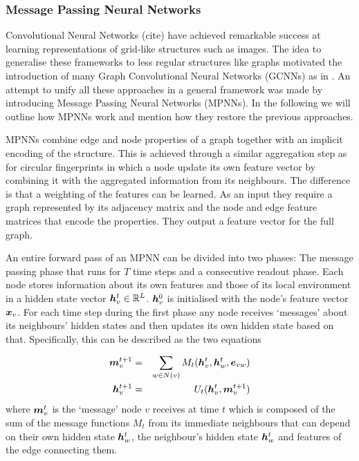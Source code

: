 \subsubsection{Message Passing Neural Networks}
\label{sec:GNN}

Convolutional Neural Networks (cite) have achieved remarkable success at learning representations of grid-like structures such as images. The idea to generalise these frameworks to less regular structures like graphs motivated the introduction of many Graph Convolutional Neural Networks (GCNNs) as in \citep{li2015gated,duvenaud2015convolutional,Kearnes_2016, Sch_tt_2017}. An attempt to unify all these approaches in a general framework was made by \cite{GilmerSRVD17} introducing Message Passing Neural Networks (MPNNs). In the following we will outline how MPNNs work and mention how they restore the previous approaches. 

MPNNs combine edge and node properties of a graph together with an implicit encoding of the structure. This is achieved through a similar aggregation step as for circular fingerprints in which a node update its own feature vector by combining it with the aggregated information from its neighbours. The difference is that a weighting of the features can be learned. As an input they require a graph represented by its adjacency matrix and the node and edge feature matrices that encode the properties. They output a feature vector for the full graph. 

An entire forward pass of an MPNN can be divided into two phases: The message passing phase that runs for $T$ time steps and a consecutive readout phase. Each node stores information about its own features and those of its local environment in a hidden state vector ${\boldsymbol h}_v^t \in {\mathbb{R}}^L$.  $\boldsymbol h_v^0$ is initialised with the node's feature vector $\boldsymbol x_v$. For each time step during the first phase any node receives `messages' about its neighbours' hidden states and then updates its own hidden state based on that. Specifically, this can be described as the two equations

\begin{eqnarray}
\boldsymbol m_v^{t+1} & =& \sum_{w\in N(v)} M_t(\boldsymbol h_v^t, \boldsymbol h_w^t, \boldsymbol e_{vw}) \label{eq:message_passing} \\
\boldsymbol h_v^{t+1} & =& U_t(\boldsymbol h_v^t, \boldsymbol m_v^{t+1})\label{eq:updating}
\end{eqnarray}
where $\boldsymbol m_v^t$ is the `message' node $v$ receives at time $t$ which is composed of the sum of the message functions $M_t$ from its immediate neighbours that can depend on their own hidden state $\boldsymbol h_w^t$, the neighbour's hidden state $\boldsymbol h_w^t$ and features of the edge connecting them.

